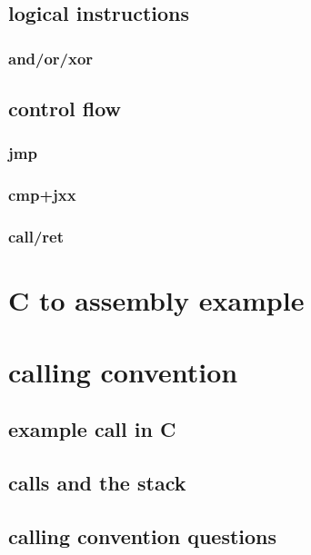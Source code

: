 \subsection{logical instructions}

\subsubsection{and/or/xor}



\subsection{control flow}

\subsubsection{jmp}



\subsubsection{cmp+jxx}



\subsubsection{call/ret}



\section{C to assembly example}

\section{calling convention}

\subsection{example call in C}

\subsection{calls and the stack}

\subsection{calling convention questions}

